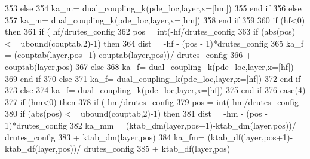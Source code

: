 \begin{DoxyCode}
353                   \textcolor{keywordflow}{else}
354                         ka\_m= dual\_coupling\_k(pde\_loc,layer,x=[hm])
355 \textcolor{keywordflow}{                  end if}
356                 \textcolor{keywordflow}{else}
357                   ka\_m= dual\_coupling\_k(pde\_loc,layer,x=[hm])
358 \textcolor{keywordflow}{                end if}
359         
360                 \textcolor{keywordflow}{if} (hf<0) \textcolor{keywordflow}{then}
361                   \textcolor{keywordflow}{if} ( hf/drutes_config%
362                         pos = int(-hf/drutes_config%
363                         \textcolor{keywordflow}{if} (abs(pos) <= ubound(couptab,2)-1) \textcolor{keywordflow}{then}
364                           dist = -hf - (pos - 1)*drutes_config%
365                           ka\_f = (couptab(layer,pos+1)-couptab(layer,pos))/
      drutes_config%
366 \textcolor{comment}{                           + couptab(layer,pos)}
367 \textcolor{comment}{                        }\textcolor{keywordflow}{else}
368                           ka\_f= dual\_coupling\_k(pde\_loc,layer,x=[hf])
369 \textcolor{keywordflow}{                        end if}
370                   \textcolor{keywordflow}{else}
371                         ka\_f= dual\_coupling\_k(pde\_loc,layer,x=[hf])
372 \textcolor{keywordflow}{                  end if}
373                 \textcolor{keywordflow}{else}
374                   ka\_f= dual\_coupling\_k(pde\_loc,layer,x=[hf])
375 \textcolor{keywordflow}{                end if}
376     \textcolor{keywordflow}{case}(4)
377                 \textcolor{keywordflow}{if} (hm<0) \textcolor{keywordflow}{then}
378                   \textcolor{keywordflow}{if} ( hm/drutes_config%
379                         pos = int(-hm/drutes_config%
380                         \textcolor{keywordflow}{if} (abs(pos) <= ubound(couptab,2)-1) \textcolor{keywordflow}{then}
381                           dist = -hm - (pos - 1)*drutes_config%
382                           ka\_mm = (ktab\_dm(layer,pos+1)-ktab\_dm(layer,pos))/
      drutes_config%
383 \textcolor{comment}{                          + ktab\_dm(layer,pos)}
384 \textcolor{comment}{                          ka\_fm= (ktab\_df(layer,pos+1)-ktab\_df(layer,pos))/
      drutes_config%
385 \textcolor{comment}{                          + ktab\_df(layer,pos)}
}
\end{DoxyCode}
